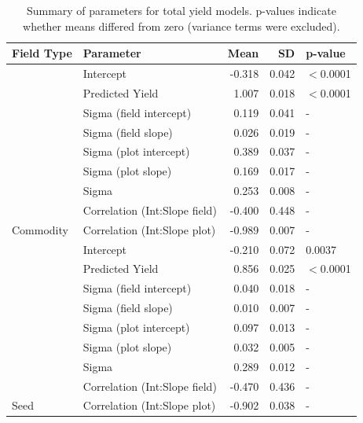 \documentclass[12pt]{article} %
\begin{document}

\begin{table}[h]
\centering\begingroup\fontsize{9}{11}\selectfont
\caption{Summary of parameters for total yield models. p-values indicate whether means differed from zero (variance terms were excluded).}
\begin{tabular}{l|l|r|r|l}
\hline
Field Type & Parameter & Mean & SD & p-value\\
\hline
 & Intercept & -0.318 & 0.042 & $<$0.0001\\
\cline{2-5}
 & Predicted Yield & 1.007 & 0.018 & $<$0.0001\\
\cline{2-5}
 & Sigma (field intercept) & 0.119 & 0.041 & -\\
\cline{2-5}
 & Sigma (field slope) & 0.026 & 0.019 & -\\
\cline{2-5}
 & Sigma (plot intercept) & 0.389 & 0.037 & -\\
\cline{2-5}
 & Sigma (plot slope) & 0.169 & 0.017 & -\\
\cline{2-5}
 & Sigma & 0.253 & 0.008 & -\\
\cline{2-5}
 & Correlation (Int:Slope field) & -0.400 & 0.448 & -\\
\cline{2-5}
\multirow{-9}{*}{\raggedright\arraybackslash Commodity} & Correlation (Int:Slope plot) & -0.989 & 0.007 & -\\
\cline{1-5}
 & Intercept & -0.210 & 0.072 & 0.0037\\
\cline{2-5}
 & Predicted Yield & 0.856 & 0.025 & $<$0.0001\\
\cline{2-5}
 & Sigma (field intercept) & 0.040 & 0.018 & -\\
\cline{2-5}
 & Sigma (field slope) & 0.010 & 0.007 & -\\
\cline{2-5}
 & Sigma (plot intercept) & 0.097 & 0.013 & -\\
\cline{2-5}
 & Sigma (plot slope) & 0.032 & 0.005 & -\\
\cline{2-5}
 & Sigma & 0.289 & 0.012 & -\\
\cline{2-5}
 & Correlation (Int:Slope field) & -0.470 & 0.436 & -\\
\cline{2-5}
\multirow{-9}{*}{\raggedright\arraybackslash Seed} & Correlation (Int:Slope plot) & -0.902 & 0.038 & -\\
\hline
\end{tabular}
\endgroup{}
\end{table}
\end{document}
